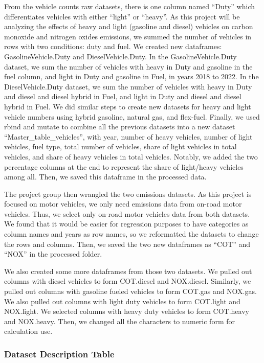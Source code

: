 \documentclass[
  12pt,
]{article}
\begin{document}
From the vehicle counts raw datasets, there is one column named ``Duty''
which differentiates vehicles with either ``light'' or ``heavy''. As
this project will be analyzing the effects of heavy and light (gasoline
and diesel) vehicles on carbon monoxide and nitrogen oxides emissions,
we summed the number of vehicles in rows with two conditions: duty and
fuel. We created new dataframes: GasolineVehicle.Duty and
DieselVehicle.Duty. In the GasolineVehicle.Duty dataset, we sum the
number of vehicles with heavy in Duty and gasoline in the fuel column,
and light in Duty and gasoline in Fuel, in years 2018 to 2022. In the
DieselVehicle.Duty dataset, we sum the number of vehicles with heavy in
Duty and diesel and diesel hybrid in Fuel, and light in Duty and diesel
and diesel hybrid in Fuel. We did similar steps to create new datasets
for heavy and light vehicle numbers using hybrid gasoline, natural gas,
and flex-fuel. Finally, we used rbind and mutate to combine all the
previous datasets into a new dataset ``Master\_table\_vehicles'', with
year, number of heavy vehicles, number of light vehicles, fuel type,
total number of vehicles, share of light vehicles in total vehicles, and
share of heavy vehicles in total vehicles. Notably, we added the two
percentage columns at the end to represent the share of light/heavy
vehicles among all. Then, we saved this dataframe in the processed data.

The project group then wrangled the two emissions datasets. As this
project is focused on motor vehicles, we only need emissions data from
on-road motor vehicles. Thus, we select only on-road motor vehicles data
from both datasets. We found that it would be easier for regression
purposes to have categories as column names and years as row names, so
we reformatted the datasets to change the rows and columns. Then, we
saved the two new dataframes as ``COT'' and ``NOX'' in the processed
folder.

We also created some more dataframes from those two datasets. We pulled
out columns with diesel vehicles to form COT.diesel and NOX.diesel.
Similarly, we pulled out columns with gasoline fueled vehicles to form
COT.gas and NOX.gas. We also pulled out columns with light duty vehicles
to form COT.light and NOX.light. We selected columns with heavy duty
vehicles to form COT.heavy and NOX.heavy. Then, we changed all the
characters to numeric form for calculation use.

\hypertarget{dataset-description-table}{%
\subsubsection{Dataset Description
Table}\label{dataset-description-table}}
\end{document}
